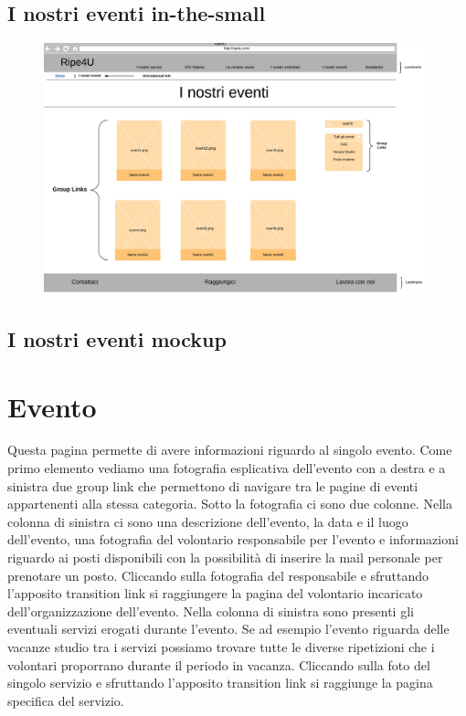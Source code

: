         \subsection{I nostri eventi in-the-small}
        \begin{figure}[H]
            \centering
            \includegraphics[scale=0.37]{resources/images/iNostriEventi-in-the-small.jpg}
        \end{figure}

        \subsection{I nostri eventi mockup}
    
    \section{Evento}
    Questa pagina permette di avere informazioni riguardo al singolo evento.
    Come primo elemento vediamo una fotografia esplicativa dell'evento con a
    destra e a sinistra due group link che permettono di navigare tra le pagine
    di eventi appartenenti alla stessa categoria. Sotto la fotografia ci sono
    due colonne. Nella colonna di sinistra ci sono una descrizione dell'evento,
    la data e il luogo dell'evento, una fotografia del volontario responsabile
    per l'evento e informazioni riguardo ai posti disponibili con la possibilità
    di inserire la mail personale per prenotare un posto. Cliccando sulla
    fotografia del responsabile e sfruttando l'apposito transition link si
    raggiungere la pagina del volontario incaricato dell'organizzazione
    dell'evento. Nella colonna di sinistra sono presenti gli eventuali servizi
    erogati durante l'evento. Se ad esempio l'evento riguarda delle vacanze
    studio tra i servizi possiamo trovare tutte le diverse ripetizioni che i
    volontari proporrano durante il periodo in vacanza. Cliccando sulla foto del
    singolo servizio e sfruttando l'apposito transition link si raggiunge la
    pagina specifica del servizio.

